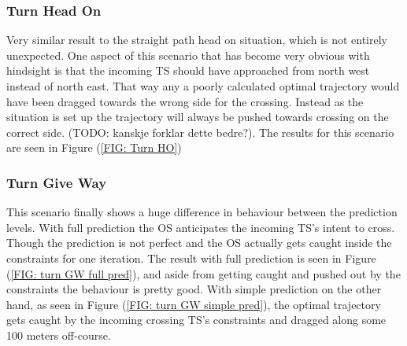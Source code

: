 


\subsubsection{Turn Head On}
Very similar result to the straight path head on situation, which is not entirely unexpected. One aspect of this scenario that
has become very obvious with hindsight is that the incoming TS should have approached from north west instead of north east. That way
any a poorly calculated optimal trajectory would have been dragged towards the wrong side for the crossing. Instead as the situation is set
up the trajectory will always be pushed towards crossing on the correct side. (TODO: kanskje forklar dette bedre?).
The results for this scenario are seen in Figure (\ref{FIG: Turn HO})

\subsubsection{Turn Give Way}
This scenario finally shows a huge difference in behaviour between the prediction levels. With full prediction the OS
anticipates the incoming TS's intent to cross. Though the prediction is not perfect and the OS actually gets caught inside the
constraints for one iteration. The result with full prediction is seen in Figure (\ref{FIG: turn GW full pred}), and aside from
getting caught and pushed out by the constraints the behaviour is pretty good.
With simple prediction on the other hand, as seen in Figure (\ref{FIG: turn GW simple pred}), the optimal trajectory gets caught by the
incoming crossing TS's constraints and dragged along some 100 meters off-course.

